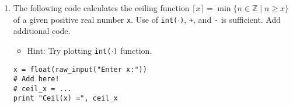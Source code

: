 \documentclass[../main.tex]{subfiles}
\begin{document}
\begin{enumerate}
\item The following code calculates the ceiling function $\lceil x \rceil = \min \{n \in \mathbb{Z} \mid n \geq x\}$ of a given positive real number \texttt{x}.
Use of \texttt{int($\cdot$)}, \texttt{+}, and \texttt{-} is sufficient.
Add additional code.
\begin{itemize}
\item Hint: Try plotting \texttt{int($\cdot$)} function.
\end{itemize}
\begin{verbatim}
x = float(raw_input("Enter x:"))
# Add here!
# ceil_x = ...
print "Ceil(x) =", ceil_x
\end{verbatim}
\end{enumerate}
\end{document}
